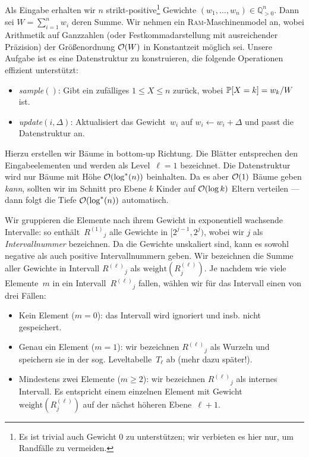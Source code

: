 \def\rng#1#2{\ensuremath{R^{(#1)}}_{#2}}
\def\wght{\ensuremath{\mathrm{weight}}}
\def\wrng#1#2{\ensuremath{\wght(R^{(#1)}_{#2})}}

\bigskip

Als Eingabe erhalten wir $n$ strikt-positive\footnote{Es ist trivial auch Gewicht $0$ zu unterstützen; wir verbieten es hier nur, um Randfälle zu vermeiden.} Gewichte $(w_1, \ldots, w_n) \in \mathbb Q_{>0}^n$.
Dann sei $W = \sum_{i=1}^n w_i$ deren Summe.
Wir nehmen ein \textsc{Ram}-Maschinenmodel an, wobei Arithmetik auf Ganzzahlen (oder Festkommadarstellung mit ausreichender Präzision) der Größenordnung $\mathcal{O}\!\left(W\right)$ in Konstantzeit möglich sei.
Unsere Aufgabe ist es eine Datenstruktur zu konstruieren, die folgende Operationen effizient unterstützt:
\begin{itemize}
    \item \emph{sample$()$}: Gibt ein zufälliges $1 \le X \le n$ zurück, wobei $\mathbb{P}\!\left[X = k\right] = w_k / W$ ist.
    \item \emph{update$(i, \Delta)$}: Aktualisiert das Gewicht~$w_i$ auf $w_i \gets w_i + \Delta$ und passt die Datenstruktur an.
\end{itemize}

Hierzu erstellen wir Bäume in bottom-up Richtung.
Die Blätter entsprechen den Eingabeelementen und werden als Level~$\ell = 1$ bezeichnet.
Die Datenstruktur wird nur Bäume mit Höhe $\mathcal{O}\!\left(\log^*(n)\right)$ beinhalten.
Da es aber $\mathcal{O}\!\left(1\right)$ Bäume geben \emph{kann}, sollten wir im Schnitt pro Ebene $k$ Kinder auf $\mathcal{O}\!\left(\log k\right)$ Eltern verteilen --- dann folgt die Tiefe $\mathcal{O}\!\left(\log^*(n)\right)$ automatisch.

Wir \aside{$\rng{\ell}{j}$ Intervall $[2^{j-1}, 2^j)$ auf Ebene~$\ell$} gruppieren die Elemente nach ihrem Gewicht in exponentiell wachsende Intervalle:
so enthält~$\rng{1}{j}$ alle Gewichte in $[2^{j-1}, 2^j)$, wobei wir $j$ als \emph{Intervallnummer}  bezeichnen.
Da die Gewichte unskaliert sind, kann es sowohl negative als auch positive Intervallnummern geben.
Wir bezeichnen die Summe aller Gewichte in Intervall $\rng{\ell}{j}$ als $\wrng{\ell}{j}$.
Je  nachdem wie viele Elemente~$m$ in ein Intervall~$\rng{\ell}{j}$ fallen, wählen wir für das Intervall einen von drei Fällen:
\begin{itemize}
    \item Kein Element ($m=0$): das Intervall wird ignoriert und insb. nicht gespeichert.
    \item Genau ein Element ($m=1$): wir bezeichnen $\rng{\ell}{j}$ als Wurzeln und speichern sie in der sog. Leveltabelle~$T_\ell$ ab (mehr dazu später!).
    \item Mindestens zwei Elemente ($m \ge 2$):  wir bezeichnen $\rng{\ell}{j}$ als internes Intervall.
          Es entspricht einem einzelnen Element mit Gewicht $\wrng{\ell}{j}$ auf der nächst höheren Ebene~$\ell + 1$.
\end{itemize}

